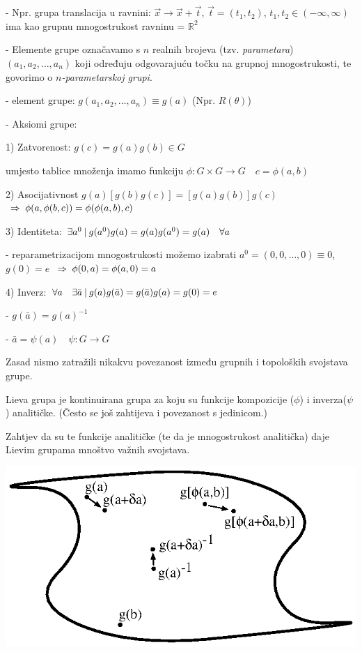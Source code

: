 - Npr. grupa translacija u ravnini: $\vec{x}\to\vec{x}+\vec{t}$,
  $\vec{t}=(t_1, t_2)$, $t_1, t_2 \in (-\infty, \infty)$ ima kao
 grupnu mnogostrukost ravninu = $\mathbb{R}^2$

- Elemente grupe označavamo s $n$ realnih brojeva (tzv. \emph{parametara}) 
  $(a_1, a_2, \ldots, a_n)$ koji određuju odgovarajuću točku na 
  grupnoj mnogostrukosti, te govorimo o \emph{$n$-parametarskoj grupi}.

- element grupe: $g(a_1, a_2, \ldots, a_n)\equiv g(a)$ (Npr. $R(\theta)$)

- Aksiomi grupe:

1) Zatvorenost: $g(c)=g(a)g(b) \in G$

    umjesto tablice množenja imamo funkciju $\phi: G\times G \to G \quad 
      c=\phi(a,b)$

2) Asocijativnost $g(a)[g(b)g(c)]=[g(a)g(b)]g(c)$ 
    $\;\Rightarrow\; \phi(a, \phi(b,c))=\phi(\phi(a,b),c) $

3) Identiteta: $\exists a^0 \: | \: g(a^0)g(a)=g(a)g(a^0)=g(a)\quad \forall a$

    - reparametrizacijom mnogostrukosti možemo izabrati $a^0=(0, 0, \ldots, 0)
     \equiv 0$, $g(0)=e$ $\;\Rightarrow\; \phi(0,a)=\phi(a,0)=a$

4) Inverz: $\forall a\quad \exists \bar{a} \: | \: g(a)g(\bar{a})=
        g(\bar{a})g(a)=g(0)=e$

    - $g(\bar{a})=g(a)^{-1}$

    - $\bar{a}=\psi(a) \quad \psi:G\to G$


Zasad nismo zatražili nikakvu povezanost između grupnih i topoloških
svojstava grupe. 


\begin{definicija}
  Lieva grupa je kontinuirana grupa za koju su funkcije kompozicije
($\phi$) i inverza($\psi$) analitičke. (Često se još zahtijeva i
povezanost s jedinicom.)
\end{definicija}


Zahtjev da su te funkcije analitičke (te da je mnogostrukost
analitička) daje Lievim grupama mnoštvo važnih svojstava.


\centerline{\includegraphics[scale=1.0]{pics/lieva_mnogostrukost.eps}}

